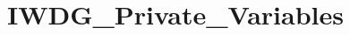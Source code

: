 \hypertarget{group___i_w_d_g___private___variables}{\section{I\-W\-D\-G\-\_\-\-Private\-\_\-\-Variables}
\label{group___i_w_d_g___private___variables}
}
